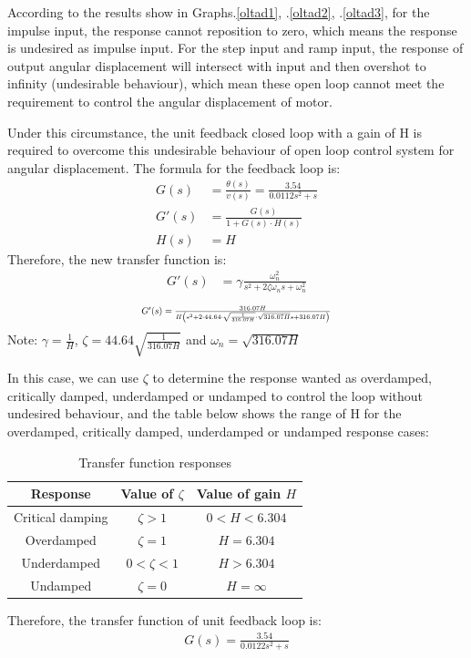\documentclass[conference]{IEEEtran}
\begin{document}
According to the results show in Graphs.\ref{oltad1}, .\ref{oltad2}, .\ref{oltad3}, for the impulse input, the response cannot reposition to zero, which means the response is undesired as impulse input. For the step input and ramp input, the response of output angular displacement will intersect with input and then overshot to infinity (undesirable behaviour), which mean these open loop cannot meet the requirement to control the angular displacement of motor. 

Under this circumstance, the unit feedback closed loop with a gain of H is required to overcome this undesirable behaviour of open loop control system for angular displacement. The formula for the feedback loop is:
\begin{align}
    G(s) &= \frac{\theta (s)}{v(s)} = \frac{3.54}{0.0112s^2 + s}\\
    G'(s) &= \frac{G(s)}{1 + G(s) \cdot H(s)}\\
    H(s) &= H
\end{align}
Therefore, the new transfer function is:
\begin{align}
    G'(s) &= \gamma \frac{\omega_n^2}{s^2 + 2\zeta \omega_n s + \omega_n^2}
\end{align}
\begin{align}
    \resizebox{.43 \textwidth}{!}
    {$
    G'(s) = \frac{316.07H}{H\left( s^2 + 2 \cdot 44.64 \cdot \sqrt{\frac{1}{316.07H}} \cdot \sqrt{316.07 H} s + 316.07 H\right)}
    $}
\end{align}
Note: $\gamma = \frac{1}{H}$, $\zeta = 44.64 \sqrt{\frac{1}{316.07H}}$ and $\omega_n = \sqrt{316.07H}$

In this case, we can use $\zeta$ to determine the response wanted as overdamped, critically damped, underdamped or undamped to control the loop without undesired behaviour, and the table below shows the range of H for the overdamped, critically damped, underdamped or undamped response cases: 
\begin{table}[htbp]
    \caption{Transfer function responses}
    \begin{center}
    \begin{tabular}{|c|c|c|}
    \hline
    \textbf{Response} & \textbf{Value of $\zeta$} & \textbf{Value of gain $H$}\\
    \hline
    \hline
    Critical damping & $\zeta > 1$ & $ 0< H < 6.304$\\
    \hline
    Overdamped & $\zeta = 1$ & $H=6.304$\\
    \hline
    Underdamped & $0<\zeta<1$ & $H > 6.304$\\
    \hline
    Undamped & $\zeta = 0$ & $H = \infty$\\
    \hline
    \end{tabular}
    \label{tfrtable}
    \end{center}
\end{table}
Therefore, the transfer function of unit feedback loop is:
\begin{align}
    G(s) = \frac{3.54}{0.0122s^2 + s}
    \label{tf}
\end{align}
\end{document}
